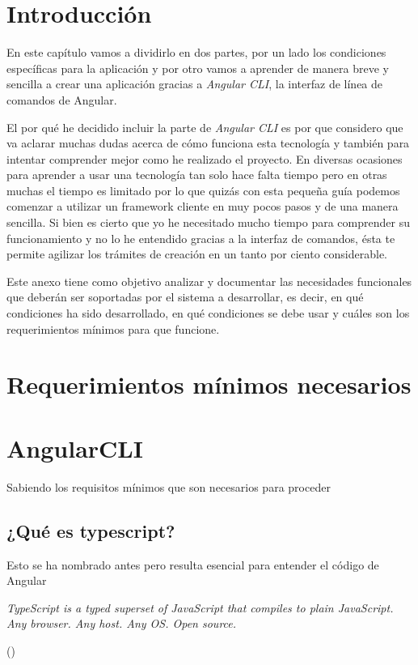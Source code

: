 
\section{Introducción}\label{introduccion-programador}
En este capítulo vamos a dividirlo en dos partes, por un lado los condiciones específicas para la aplicación y por otro vamos a aprender de manera breve y sencilla a crear una aplicación gracias a \emph{Angular CLI}, la interfaz de línea de comandos de Angular. 

El por qué he decidido incluir la parte de \emph{Angular CLI} es por que considero que va aclarar muchas dudas acerca de cómo funciona esta tecnología y también para intentar comprender mejor como he realizado el proyecto. En diversas ocasiones para aprender a usar una tecnología tan solo hace falta tiempo pero en otras muchas el tiempo es limitado por lo que quizás con esta pequeña guía podemos comenzar a utilizar un framework cliente en muy pocos pasos y de una manera sencilla. Si bien es cierto que yo he necesitado mucho tiempo para comprender su funcionamiento y no lo he entendido gracias a la interfaz de comandos, ésta te permite agilizar los trámites de creación en un tanto por ciento considerable.

Este anexo tiene como objetivo analizar y documentar las necesidades funcionales que deberán ser soportadas por el sistema a desarrollar, es decir, en qué condiciones ha sido desarrollado, en qué condiciones se debe usar y cuáles son los requerimientos mínimos para que funcione.

\section{Requerimientos mínimos necesarios}\label{angularCLI}


\section{AngularCLI}\label{angularCLI}
Sabiendo los requisitos mínimos que son necesarios para proceder 

\subsection{¿Qué es typescript?}\label{typesript}
Esto se ha nombrado antes pero resulta esencial para entender el código de Angular

\begin{center}
    \begin{minipage}{0.9\linewidth}
        \vspace{5pt}%
        {\small
            \emph{TypeScript is a typed superset of JavaScript that compiles to plain JavaScript. Any browser. Any host. Any OS. Open source.}
        }
        \begin{flushright}
            (\cite{TypeScript Web})
        \end{flushright}
        \vspace{5pt}%
    \end{minipage}
\end{center}

